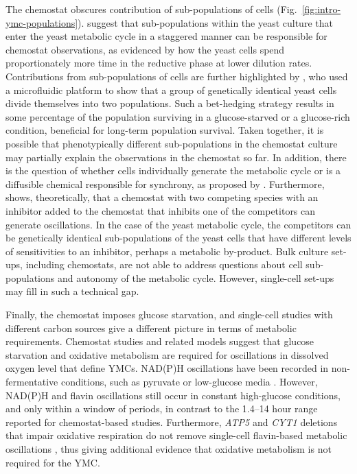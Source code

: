 The chemostat obscures contribution of sub-populations of cells (Fig.\ \ref{fig:intro-ymc-populations}).
\textcite{burnettiCellCycleStart2016} suggest that sub-populations within the yeast culture that enter the yeast metabolic cycle in a staggered manner can be responsible for chemostat observations, as evidenced by how the yeast cells spend proportionately more time in the reductive phase at lower dilution rates.
Contributions from sub-populations of cells are further highlighted by \textcite{bagameryPutativeBetHedgingStrategy2020}, who used a microfluidic platform to show that a group of genetically identical yeast cells divide themselves into two populations.
Such a bet-hedging strategy results in some percentage of the population surviving in a glucose-starved or a glucose-rich condition, beneficial for long-term population survival.
Taken together, it is possible that phenotypically different sub-populations in the chemostat culture may partially explain the observations in the chemostat so far.
In addition, there is the question of whether cells individually generate the metabolic cycle or is a diffusible chemical responsible for synchrony, as proposed by \textcite{krishnaMinimalPushPull2018}.
Furthermore, \textcite{smithTheoryChemostatDynamics1995} shows, theoretically, that a chemostat with two competing species with an inhibitor added to the chemostat that inhibits one of the competitors can generate oscillations.
In the case of the yeast metabolic cycle, the competitors can be genetically identical sub-populations of the yeast cells that have different levels of sensitivities to an inhibitor, perhaps a metabolic by-product.
Bulk culture set-ups, including chemostats, are not able to address questions about cell sub-populations and autonomy of the metabolic cycle.
However, single-cell set-ups may fill in such a technical gap.

Finally, the chemostat imposes glucose starvation, and single-cell studies with different carbon sources give a different picture in terms of metabolic requirements.
Chemostat studies and related models suggest that glucose starvation and oxidative metabolism are required for oscillations in dissolved oxygen level that define YMCs.
NAD(P)H oscillations have been recorded in non-fermentative conditions, such as pyruvate or low-glucose media \parencite{papagiannakisAutonomousMetabolicOscillations2017}.
However, NAD(P)H \parencite{papagiannakisAutonomousMetabolicOscillations2017,ozsezenInferenceHighLevelInteraction2019} and flavin \parencite{baumgartnerFlavinbasedMetabolicCycles2018} oscillations still occur in constant high-glucose conditions, and only within a window of periods, in contrast to the 1.4--14 hour range reported for chemostat-based studies.
Furthermore, \textit{ATP5} and \textit{CYT1} deletions that impair oxidative respiration do not remove single-cell flavin-based metabolic oscillations \parencite{baumgartnerFlavinbasedMetabolicCycles2018}, thus giving additional evidence that oxidative metabolism is not required for the YMC.

